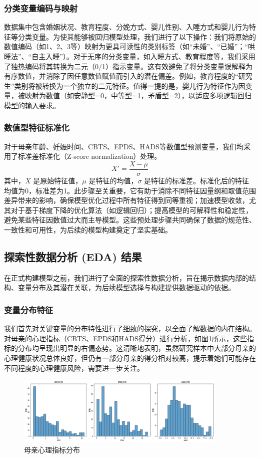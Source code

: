 \documentclass[withoutpreface,bwprint]{cumcmthesis}
\begin{document}
\subsubsection{分类变量编码与映射}
数据集中包含婚姻状况、教育程度、分娩方式、婴儿性别、入睡方式和婴儿行为特征等分类变量。为使其能够被回归模型处理，我们进行了以下操作：我们将原始的数值编码（如1、2、3等）映射为更具可读性的类别标签（如“未婚”、“已婚”；“哄睡法”、“自主入睡”）。对于无序的分类变量，如入睡方式、教育程度等，我们采用了独热编码将其转换为二元（0/1）指示变量。这有效避免了将分类变量误解释为有序数值，并消除了因任意数值赋值而引入的潜在偏差。例如，教育程度的“研究生”类别将被转换为一个独立的二元特征。值得一提的是，婴儿行为特征作为因变量，被映射为数值（如安静型=0，中等型=1，矛盾型=2），以适应多项逻辑回归模型的输入要求。

\subsubsection{数值型特征标准化}
对于母亲年龄、妊娠时间、CBTS、EPDS、HADS等数值型预测变量，我们均采用了标准差标准化（Z-score normalization）处理。
$$ X' = \frac{X - \mu}{\sigma} $$
其中，$X$ 是原始特征值，$\mu$ 是特征的均值，$\sigma$ 是特征的标准差。标准化后的特征均值为0，标准差为1。此步骤至关重要，它有助于消除不同特征因量纲和取值范围差异带来的影响，确保模型优化过程中所有特征得到同等重视；加速模型收敛，尤其对于基于梯度下降的优化算法（如逻辑回归）；提高模型的可解释性和稳定性，避免某些特征因数值过大而主导模型。这些预处理步骤共同确保了数据的规范性、一致性和可用性，为后续的模型构建奠定了坚实基础。

\subsection{探索性数据分析 (EDA) 结果}
在正式构建模型之前，我们进行了全面的探索性数据分析，旨在揭示数据内部的结构、变量分布及其潜在关联，为后续模型选择与构建提供数据驱动的依据。

\subsubsection{变量分布特征}
我们首先对关键变量的分布特性进行了细致的探究，以全面了解数据的内在结构。
对母亲的心理指标（CBTS、EPDS和HADS得分）进行分析，如图1所示，这些指标的分布均呈现出明显的右偏态势。这清晰地表明，虽然研究样本中大部分母亲的心理健康状况总体良好，但仍有一部分母亲的得分相对较高，提示着她们可能存在不同程度的心理健康风险，需要进一步关注。

\begin{figure}[htbp]
    \centering
    \includegraphics[width=0.9\textwidth]{figures/psychological_indicators_distribution.png}
    \caption{母亲心理指标分布}
    \label{fig:psychological_indicators_distribution}
\end{figure}
\end{document}
